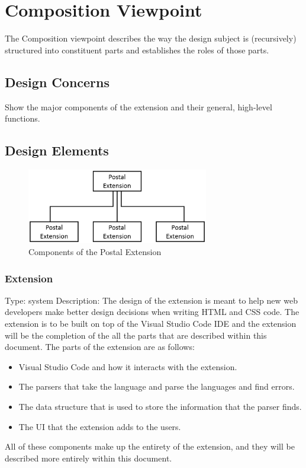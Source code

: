 \documentclass[letterpaper,10pt,titlepage,draftclsnofoot,onecolumn,onesided] {IEEEtran}
\begin{document}
\section{Composition Viewpoint}
The Composition viewpoint describes the way the design subject is (recursively) structured into constituent
parts and establishes the roles of those parts. 
\subsection{Design Concerns}
Show the major components of the extension and their general, high-level functions.
\subsection{Design Elements}
	\begin{figure}
                 \includegraphics[width=300px]{CompositionUMLEPS.eps}
                 \caption{Components of the Postal Extension}
      		\end{figure}
	\subsubsection{Extension}
	Type: system
	Description: The design of the extension is meant to help new web developers make better design decisions when writing HTML and CSS code.
	The extension is to be built on top of the Visual Studio Code IDE and the extension will be the completion of the all the parts that are described within this document. 
	The parts of the extension are as follows:
	\begin{itemize}
	\item Visual Studio Code and how it interacts with the extension.
	\item The parsers that take the language and parse the languages and find errors.
	\item The data structure that is used to store the information that the parser finds.
	\item The UI that the extension adds to the users. 
	\end{itemize}
	All of these components make up the entirety of the extension, and they will be described more entirely within this document. 
	
\end{document}
